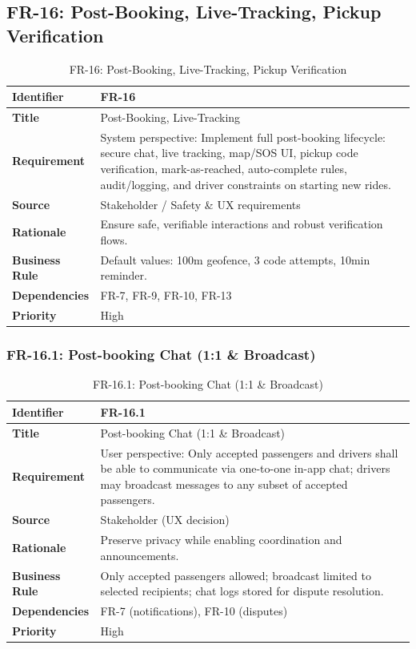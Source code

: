 \subsection{FR-16: Post-Booking, Live-Tracking, Pickup Verification}

\begin{longtable}{|p{3cm}|p{12cm}|}
\caption{FR-16: Post-Booking, Live-Tracking, Pickup Verification}
\label{tab:fr-16} \\
\hline
\rowcolor{lightgray!30}
\textbf{Identifier} & FR-16 \\
\hline
\textbf{Title} & Post-Booking, Live-Tracking \\
\hline
\textbf{Requirement} & System perspective: Implement full post-booking lifecycle: secure chat, live tracking, map/SOS UI, pickup code verification, mark-as-reached, auto-complete rules, audit/logging, and driver constraints on starting new rides. \\
\hline
\textbf{Source} & Stakeholder / Safety \& UX requirements \\
\hline
\textbf{Rationale} & Ensure safe, verifiable interactions and robust verification flows. \\
\hline
\textbf{Business Rule} & Default values: 100m geofence, 3 code attempts, 10min reminder. \\
\hline
\textbf{Dependencies} & FR-7, FR-9, FR-10, FR-13 \\
\hline
\textbf{Priority} & High \\
\hline
\end{longtable}

\subsubsection{FR-16.1: Post-booking Chat (1:1 \& Broadcast)}

\begin{longtable}{|p{3cm}|p{12cm}|}
\caption{FR-16.1: Post-booking Chat (1:1 \& Broadcast)}
\label{tab:fr-16-1} \\
\hline
\rowcolor{lightgray!30}
\textbf{Identifier} & FR-16.1 \\
\hline
\textbf{Title} & Post-booking Chat (1:1 \& Broadcast) \\
\hline
\textbf{Requirement} & User perspective: Only accepted passengers and drivers shall be able to communicate via one-to-one in-app chat; drivers may broadcast messages to any subset of accepted passengers. \\
\hline
\textbf{Source} & Stakeholder (UX decision) \\
\hline
\textbf{Rationale} & Preserve privacy while enabling coordination and announcements. \\
\hline
\textbf{Business Rule} & Only accepted passengers allowed; broadcast limited to selected recipients; chat logs stored for dispute resolution. \\
\hline
\textbf{Dependencies} & FR-7 (notifications), FR-10 (disputes) \\
\hline
\textbf{Priority} & High \\
\hline
\end{longtable}

